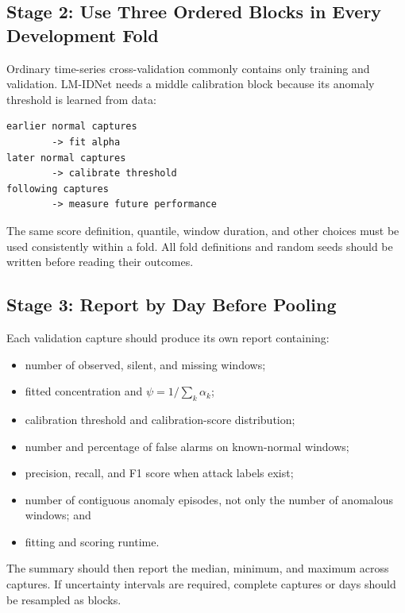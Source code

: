 \documentclass[11pt,a4paper]{article}
\begin{document}
\subsection{Stage 2: Use Three Ordered Blocks in Every Development Fold}

Ordinary time-series cross-validation commonly contains only training and
validation. LM-IDNet needs a middle calibration block because its anomaly
threshold is learned from data:

\begin{verbatim}
earlier normal captures
        -> fit alpha
later normal captures
        -> calibrate threshold
following captures
        -> measure future performance
\end{verbatim}

The same score definition, quantile, window duration, and other choices must be
used consistently within a fold. All fold definitions and random seeds should
be written before reading their outcomes.

\subsection{Stage 3: Report by Day Before Pooling}

Each validation capture should produce its own report containing:

\begin{itemize}

\item number of observed, silent, and missing windows;

\item fitted concentration and
\(\psi=1/\sum_k\alpha_k\);

\item calibration threshold and calibration-score distribution;

\item number and percentage of false alarms on known-normal windows;

\item precision, recall, and F1 score when attack labels exist;

\item number of contiguous anomaly episodes, not only the number of anomalous
windows; and

\item fitting and scoring runtime.

\end{itemize}

The summary should then report the median, minimum, and maximum across captures.
If uncertainty intervals are required, complete captures or days should be
resampled as blocks.
\end{document}

